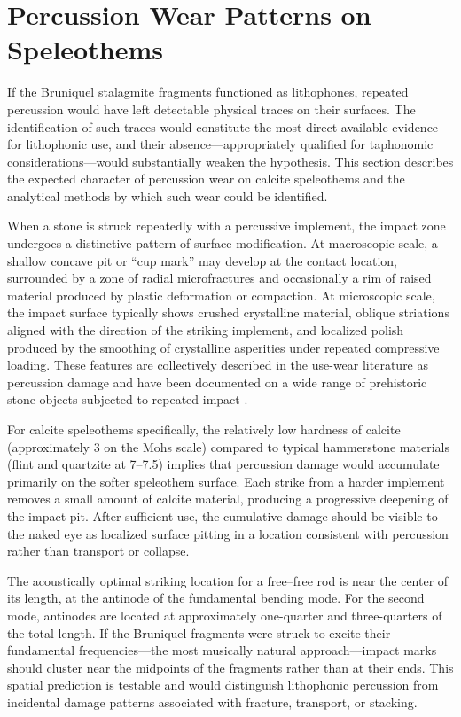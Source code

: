 \documentclass[12pt]{article}
\begin{document}
\section{Percussion Wear Patterns on Speleothems}

If the Bruniquel stalagmite fragments functioned as lithophones, repeated percussion would have left detectable physical traces on their surfaces. The identification of such traces would constitute the most direct available evidence for lithophonic use, and their absence—appropriately qualified for taphonomic considerations—would substantially weaken the hypothesis. This section describes the expected character of percussion wear on calcite speleothems and the analytical methods by which such wear could be identified.

When a stone is struck repeatedly with a percussive implement, the impact zone undergoes a distinctive pattern of surface modification. At macroscopic scale, a shallow concave pit or ``cup mark'' may develop at the contact location, surrounded by a zone of radial microfractures and occasionally a rim of raised material produced by plastic deformation or compaction. At microscopic scale, the impact surface typically shows crushed crystalline material, oblique striations aligned with the direction of the striking implement, and localized polish produced by the smoothing of crystalline asperities under repeated compressive loading. These features are collectively described in the use-wear literature as percussion damage and have been documented on a wide range of prehistoric stone objects subjected to repeated impact \citep{Fagg1956, Coles1993}.

For calcite speleothems specifically, the relatively low hardness of calcite (approximately 3 on the Mohs scale) compared to typical hammerstone materials (flint and quartzite at 7--7.5) implies that percussion damage would accumulate primarily on the softer speleothem surface. Each strike from a harder implement removes a small amount of calcite material, producing a progressive deepening of the impact pit. After sufficient use, the cumulative damage should be visible to the naked eye as localized surface pitting in a location consistent with percussion rather than transport or collapse.

The acoustically optimal striking location for a free--free rod is near the center of its length, at the antinode of the fundamental bending mode. For the second mode, antinodes are located at approximately one-quarter and three-quarters of the total length. If the Bruniquel fragments were struck to excite their fundamental frequencies—the most musically natural approach—impact marks should cluster near the midpoints of the fragments rather than at their ends. This spatial prediction is testable and would distinguish lithophonic percussion from incidental damage patterns associated with fracture, transport, or stacking.
\end{document}
